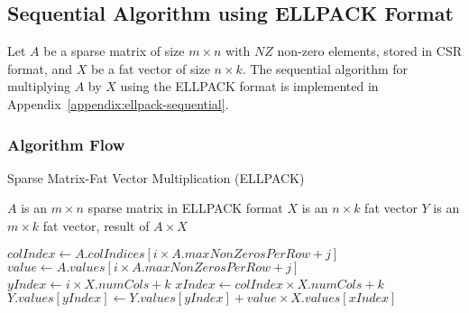 \documentclass[12pt,oneside]{book} %
\begin{document}
\newpage
\subsection{Sequential Algorithm using ELLPACK Format}
Let \( A \) be a sparse matrix of size \( m \times n \) with \( NZ \) non-zero
elements, stored in CSR format, and \( X \) be a fat vector of size \( n \times
k \). The sequential algorithm for multiplying \( A \) by \( X \) using the
ELLPACK format is implemented in Appendix~\ref{appendix:ellpack-sequential}.

\subsubsection{Algorithm Flow}

\begin{algorithm}[H]
    \caption{Sparse Matrix-Fat Vector Multiplication (ELLPACK)}
    \begin{algorithmic}
        \Require $A$ is an $m \times n$ sparse matrix in ELLPACK format
        \Require $X$ is an $n \times k$ fat vector
        \Ensure  $Y$ is an $m \times k$ fat vector, result of $A \times X$

        \State $colIndex \gets A.colIndices[i \times A.maxNonZerosPerRow + j]$
        \State $value \gets A.values[i \times A.maxNonZerosPerRow + j]$
        \State $yIndex \gets i \times X.numCols + k$
        \State $xIndex \gets colIndex \times X.numCols + k$
        \State $Y.values[yIndex] \gets Y.values[yIndex] + value \times X.values[xIndex]$
        \EndFor
        \EndIf
        \EndFor
        \EndFor
    \end{algorithmic}
\end{algorithm}
\end{document}
